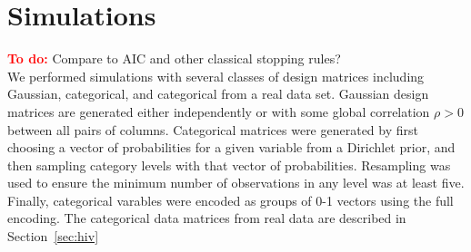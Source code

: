 \documentclass{imsart}
\newcommand{\todo}{\textcolor{red}{\textbf{To do: }}}
\newcommand{\norm}[1]{\lVert #1 \rVert}
\begin{document}
%
%



\section{Simulations}
\label{sec:simulations}

\todo Compare to AIC and other classical stopping rules? \\

We performed simulations with several classes of design matrices including
Gaussian, categorical, and categorical from a real data set. Gaussian
design matrices are generated either independently or with some global
correlation $\rho > 0$ between all pairs of columns. Categorical matrices
were generated by first choosing a vector of probabilities for a given
variable from a Dirichlet prior, and then sampling category levels with
that vector of probabilities. Resampling was used to ensure the minimum
number of observations in any level was at least five. Finally, categorical
varables were encoded as groups of 0-1 vectors using the full encoding.
The categorical data matrices from real data are described in
Section~\ref{sec:hiv}
\end{document}
